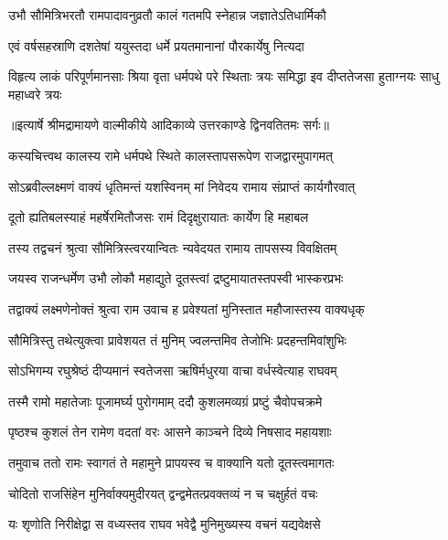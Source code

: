 \twolineshloka
{उभौ सौमित्रिभरतौ रामपादावनुव्रतौ}
{कालं गतमपि स्नेहान्न जज्ञातेऽतिधार्मिकौ} %

\twolineshloka
{एवं वर्षसहस्राणि दशतेषां ययुस्तदा}
{धर्मे प्रयतमानानां पौरकार्येषु नित्यदा} %

\fourlineindentedshloka
{विहृत्य लाकं परिपूर्णमानसाः}
{ श्रिया वृता धर्मपथे परे स्थिताः}
{त्रयः समिद्धा इव दीप्ततेजसा}
{ हुताग्नयः साधु महाध्वरे त्रयः} %


{॥इत्यार्षे श्रीमद्रामायणे वाल्मीकीये आदिकाव्ये उत्तरकाण्डे द्विनवतितमः सर्गः॥}


\twolineshloka
{कस्यचित्त्वथ कालस्य रामे धर्मपथे स्थिते}
{कालस्तापसरूपेण राजद्वारमुपागमत्} %

\twolineshloka
{सोऽब्रवील्लक्ष्मणं वाक्यं धृतिमन्तं यशस्विनम्}
{मां निवेदय रामाय संप्राप्तं कार्यगौरवात्} %

\twolineshloka
{दूतो ह्यतिबलस्याहं महर्षेरमितौजसः}
{रामं दिदृक्षुरायातः कार्येण हि महाबल} %

\twolineshloka
{तस्य तद्वचनं श्रुत्वा सौमित्रिस्त्वरयान्वितः}
{न्यवेदयत रामाय तापसस्य विवक्षितम्} %

\twolineshloka
{जयस्व राजन्धर्मेण उभौ लोकौ महाद्युते}
{दूतस्त्वां द्रष्टुमायातस्तपस्वी भास्करप्रभः} %

\twolineshloka
{तद्वाक्यं लक्ष्मणेनोक्तं श्रुत्वा राम उवाच ह}
{प्रवेश्यतां मुनिस्तात महौजास्तस्य वाक्यधृक्} %

\twolineshloka
{सौमित्रिस्तु तथेत्युक्त्वा प्रावेशयत तं मुनिम्}
{ज्वलन्तमिव तेजोभिः प्रदहन्तमिवांशुभिः} %

\twolineshloka
{सोऽभिगम्य रघुश्रेष्ठं दीप्यमानं स्वतेजसा}
{ऋषिर्मधुरया वाचा वर्धस्वेत्याह राघवम्} %

\twolineshloka
{तस्मै रामो महातेजाः पूजामर्घ्य पुरोगमाम्}
{ददौ कुशलमव्यग्रं प्रष्टुं चैवोपचक्रमे} %

\twolineshloka
{पृष्ठश्च कुशलं तेन रामेण वदतां वरः}
{आसने काञ्चने दिव्ये निषसाद महायशाः} %

\twolineshloka
{तमुवाच ततो रामः स्वागतं ते महामुने}
{प्रापयस्व च वाक्यानि यतो दूतस्त्वमागतः} %

\twolineshloka
{चोदितो राजसिंहेन मुनिर्वाक्यमुदीरयत्}
{द्वन्द्वमेतत्प्रवक्तव्यं न च चक्षुर्हतं वचः} %

\twolineshloka
{यः शृणोति निरीक्षेद्वा स वध्यस्तव राघव}
{भवेद्वै मुनिमुख्यस्य वचनं यद्यवेक्षसे} %

